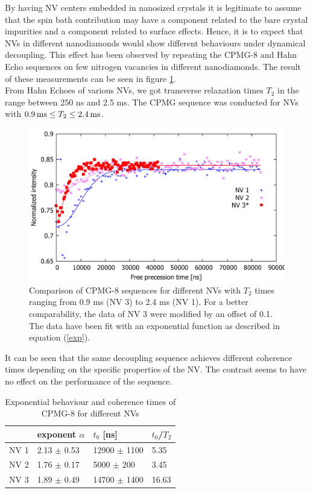 \documentclass[12pt,a4paper]{article}
\begin{document}
By having NV centers embedded in nanosized crystals it is legitimate to assume that the spin bath contribution may have a component related to the bare crystal impurities and a component related to surface effects. Hence, it is to expect that NVs in different nanodiamonds would show different behaviours under dynamical decoupling. This effect has  been observed by repeating the CPMG-8 and  Hahn Echo sequences on few nitrogen vacancies in different nanodiamonds. The result of these measurements can be seen in figure \ref{C8}.
\\
From Hahn Echoes of various NVs, we got transverse relaxation times $T_2$ in the range between 250 ns and 2.5 ms. The CPMG sequence was conducted for NVs with $\unit[0.9]{ms}\leq T_2\leq\unit[2.4]{ms}$. 
\begin{figure}[H]
\includegraphics[scale=0.6]{cv.pdf} 
\caption{Comparison of CPMG-8 sequences for different NVs with $T_2$ times ranging from 0.9 ms (NV 3) to 2.4 ms (NV 1). For a better comparability, the data of NV 3 were modified by an offset of 0.1. The data have been fit with an exponential function as described in equation (\ref{exp}).}
\label{C8}
\end{figure}
It can be seen that the same decoupling sequence achieves different coherence times depending on the specific properties of the NV. The contrast seems to have no effect on the performance of the sequence.\\
\begin{table}[H]
\centering
\caption{Exponential behaviour and coherence times of CPMG-8 for different NVs}
\label{cv}
\begin{tabular}{l|ll|l}
&exponent $\alpha$ & $t_0$ {[}ns{]}                     & $t_0$/$T_2$             \\\hline
NV 1            & 2.13          $\pm$ 0.53 & 12900            $\pm$ 1100         & 5.35 \\
NV 2            & 1.76         $\pm$ 0.17  & 5000           $\pm$ 200       & 3.45 \\
NV 3            & 1.89         $\pm$ 0.49 & 14700         $\pm$ 1400         & 16.63
\end{tabular}
\end{table}
\end{document}
